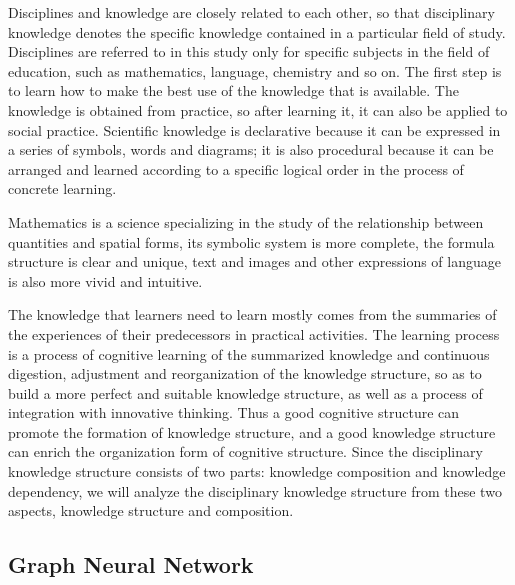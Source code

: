 Disciplines and knowledge are closely related to each other, so that disciplinary knowledge denotes the specific knowledge contained in a particular field of study. Disciplines are referred to in this study only for specific subjects in the field of education, such as mathematics, language, chemistry and so on. The first step is to learn how to make the best use of the knowledge that is available. The knowledge is obtained from practice, so after learning it, it can also be applied to social practice. Scientific knowledge is declarative because it can be expressed in a series of symbols, words and diagrams; it is also procedural because it can be arranged and learned according to a specific logical order in the process of concrete learning.

Mathematics is a science specializing in the study of the relationship between quantities and spatial forms, its symbolic system is more complete, the formula structure is clear and unique, text and images and other expressions of language is also more vivid and intuitive.

The knowledge that learners need to learn mostly comes from the summaries of the experiences of their predecessors in practical activities. The learning process is a process of cognitive learning of the summarized knowledge and continuous digestion, adjustment and reorganization of the knowledge structure, so as to build a more perfect and suitable knowledge structure, as well as a process of integration with innovative thinking. Thus a good cognitive structure can promote the formation of knowledge structure, and a good knowledge structure can enrich the organization form of cognitive structure. Since the disciplinary knowledge structure consists of two parts: knowledge composition and knowledge dependency, we will analyze the disciplinary knowledge structure from these two aspects, knowledge structure and composition.

\subsection{Graph Neural Network}


